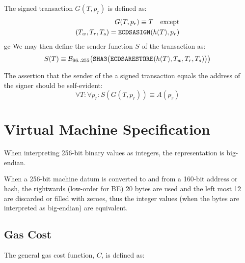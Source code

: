 \documentclass[9pt,oneside]{amsart}
\begin{document}
The signed transaction $G(T, p_r)$ is defined as:
\begin{eqnarray}
G(T, p_r) \equiv T \quad \text{except} \\
(T_w, T_r, T_s) = \mathtt{\small ECDSASIGN}(h(T), p_r)
\end{eqnarray}
gc
We may then define the sender function $S$ of the transaction as:
\begin{equation}
S(T) \equiv \mathcal{B}_{96..255}\big(\mathtt{\tiny SHA3}\big( \mathtt{\small ECDSARESTORE}(h(T), T_w, T_r, T_s) \big) \big)
\end{equation}

The assertion that the sender of the a signed transaction equals the address of the signer should be self-evident:
\begin{equation}
\forall T: \forall p_r: S(G(T, p_r)) \equiv A(p_r)
\end{equation}

\section{Virtual Machine Specification}\label{app:vm}

When interpreting 256-bit binary values as integers, the representation is big-endian.

When a 256-bit machine datum is converted to and from a 160-bit address or hash, the rightwards (low-order for BE) 20 bytes are used and the left most 12 are discarded or filled with zeroes, thus the integer values (when the bytes are interpreted as big-endian) are equivalent.

\subsection{Gas Cost}

The general gas cost function, $C$, is defined as:
\end{document}
